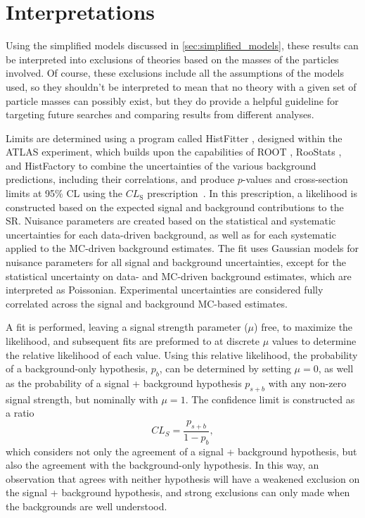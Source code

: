 
\chapter{Interpretations} %
\label{ch:interpretations} 

Using the simplified models discussed in \autoref{sec:simplified_models}, these results can be interpreted into exclusions of theories based on the masses of the particles involved. Of course, these exclusions include all the assumptions of the models used, so they shouldn't be interpreted to mean that no theory with a given set of particle masses can possibly exist, but they do provide a helpful guideline for targeting future searches and comparing results from different analyses.

Limits are determined using a program called HistFitter \cite{Baak:2014wma}, designed within the \ac{ATLAS} experiment, which builds upon the capabilities of ROOT \cite{BRUN199781}, RooStats \cite{1009.1003}, and HistFactory \cite{Cranmer:2012sba} to combine the uncertainties of the various background predictions, including their correlations, and produce $p$-values and cross-section limits at 95\% \ac{CL} using the $CL_{\text{S}}$ prescription~\cite{statforumlimits,clsread}. In this prescription, a likelihood is constructed based on the expected signal and background contributions to the \ac{SR}. Nuisance parameters are created based on the statistical and systematic uncertainties for each data-driven background, as well as for each systematic applied to the \ac{MC}-driven background estimates. The fit uses Gaussian models for nuisance parameters for all signal and background uncertainties, except for the statistical uncertainty on data- and \ac{MC}-driven background estimates, which are interpreted as Poissonian. Experimental uncertainties are considered fully correlated across the signal and background \ac{MC}-based estimates. 

A fit is performed, leaving a signal strength parameter ($\mu$) free, to maximize the likelihood, and subsequent fits are preformed to at discrete $\mu$ values to determine the relative likelihood of each value. Using this relative likelihood, the probability of a background-only hypothesis, $p_b$, can be determined by setting $\mu=0$, as well as the probability of a signal + background hypothesis $p_{s+b}$ with any non-zero signal strength, but nominally with $\mu=1$. The confidence limit is constructed as a ratio
%
\begin{equation}
CL_S = \frac{p_{s+b}}{1-p_b} , 
\end{equation}
%
which considers not only the agreement of a signal + background hypothesis, but also the agreement with the background-only hypothesis. In this way, an observation that agrees with neither hypothesis will have a weakened exclusion on the signal + background hypothesis, and strong exclusions can only made when the backgrounds are well understood.

